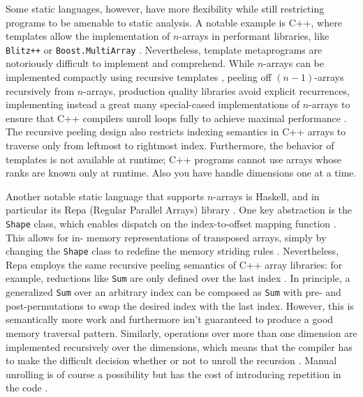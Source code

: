 \documentclass[preprint]{sigplanconf}
\newcommand{\code}[1]{\texttt{#1}}
\begin{document}
Some static languages, however, have more flexibility while
still restricting programs to be amenable to static analysis. A notable
example is C++, where templates allow the implementation of $n$-arrays in performant
libraries, like \code{Blitz++} \cite{Veldhuizen:1998ab} or
\code{Boost.MultiArray} \cite{Garcia:2005ma}.  Nevertheless, template
metaprograms are notoriously difficult to implement and
comprehend. While $n$-arrays can be implemented compactly using recursive
templates \cite{Bavestrelli:2000ct}, peeling off $(n-1)$-arrays
recursively from $n$-arrays, production quality libraries avoid explicit
recurrences, implementing instead a great many special-cased implementations
of $n$-arrays to ensure that C++ compilers unroll loops fully to achieve
maximal performance \cite{Garcia:2005ma}. The recursive peeling design also
restricts indexing semantics in C++ arrays to traverse only from  leftmost to
rightmost index. Furthermore, the behavior of templates is not available at
runtime; C++ programs cannot use arrays
whose ranks are known only at runtime. Also you have handle dimensions one
at a time.

Another notable static language that supports $n$-arrays is Haskell, and in
particular its Repa (Regular Parallel Arrays) library \cite{Keller:2010rs}.
One key abstraction is the \code{Shape} class, which enables dispatch on the
index-to-offset mapping function \cite{Keller:2010rs}. This allows for in-
memory representations of transposed arrays, simply by changing the
\code{Shape} class to redefine the memory striding rules \cite{Keller:2010rs}.
Nevertheless, Repa employs the same recursive peeling semantics of C++ array
libraries: for example, reductions like \code{Sum} are only defined
over the last index \cite{Keller:2010rs}. In principle, a generalized
\code{Sum} over an arbitrary index can be composed as \code{Sum} with pre- and
post-permutations to swap the desired index with the last index. However,
this is semantically more work and furthermore isn't guaranteed to produce a
good memory traversal pattern. Similarly, operations over more than one
dimension are implemented recursively over the dimensions, which means that
the compiler has to make the difficult decision whether or not to unroll the
recursion \cite{Lippmeier:2011ep}. Manual unrolling is of course a possibility
but has the cost of introducing repetition in the code
\cite{Lippmeier:2012gp}.

\end{document}
